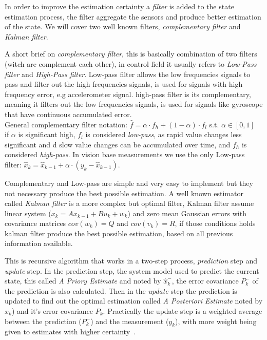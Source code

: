 \documentclass[ twoside, 12pt ]{article}
\begin{document}
In order to improve the estimation certainty a \textit{filter} is added to the state estimation process, the filter aggregate the sensors and produce better estimation of the state.
We will cover two well known filters, \textit{complementary filter} and \textit{Kalman filter}.

A short brief on \textit{complementary filter}, this is basically combination of two filters (witch are complement each other), in control field it usually refers to \textit{Low-Pass filter} and \textit{High-Pass filter}.
Low-pass filter allows the low frequencies signals to pass and filter out the high frequencies signals, is used for signals with high frequency error, e.g accelerometer signal.
high-pass filter is its complementary, meaning it filters out the low frequencies signals, is used for signals like gyroscope that have continuous accumulated error.
\\General complementary filter notation: $\hat{f} = \alpha \cdot f_h + (1-\alpha) \cdot f_l$ s.t. $\alpha \in [0,1]$
\\if $\alpha$ is significant high, $f_l$ is considered \textit{low-pass}, as rapid value changes less significant and d slow value changes can be accumulated over time, and $f_h$ is considered \textit{high-pass}.
In vision base measurements we use the only Low-pass filter:
$ \hat{x}_k = \hat{x}_{k-1} + \alpha \cdot (y_k - \hat{x}_{k-1}) $.

Complementary and Low-pass are simple and very easy to implement but they not necessary produce the best possible estimation.
A well known estimator called \textit{Kalman filter} is a more complex but optimal filter, Kalman filter assume linear system ($x_{k}=Ax_{k-1} + Bu_{k} + w_{k}$) and zero mean Gaussian errors with covariance matrices $cov(w_k)=Q$ and $cov(v_k)=R$, if those conditions holds kalman filter produce the best possible estimation, based on all previous information available.

This is recursive algorithm that works in a two-step process, \textit{prediction} step and \textit{update} step. 
In the prediction step, the system model used to predict the current state, this called \textit{A Priory Estimate} and noted by $\hat{x}_k^-$,
the error covariance $P_k^-$ of the prediction is also calculated.
Then in the \textit{update} step the prediction is updated to find out the optimal estimation called \textit{A Posteriori Estimate} noted by $\hat{x}_k$) and it's error covariance $P_k$.
Practically the update step is a weighted average between the prediction ($P_k^-$) and the measurement ($y_k$), with more weight being given to estimates with higher certainty~\cite{Kalman-filter}. 
\end{document}
